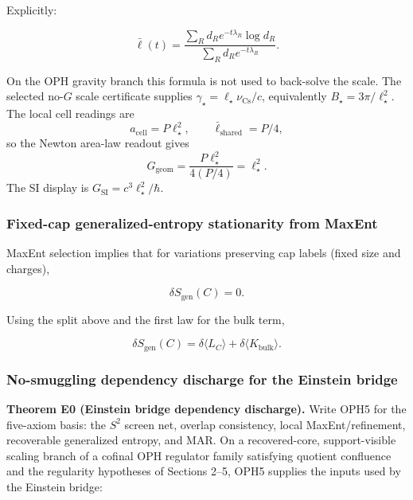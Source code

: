 Explicitly:

\[
\bar{\ell}(t) = \frac{\sum_R d_R e^{-t\lambda_R} \log d_R}{\sum_R d_R e^{-t\lambda_R}}.
\]

On the OPH gravity branch this formula is not used to back-solve the scale. The selected
no-\(G\) scale certificate supplies
\(\gamma_\star=\ell_\star\nu_{\mathrm{Cs}}/c\), equivalently
\(B_\star=3\pi/\ell_\star^2\). The local cell readings are
\[
a_{\mathrm{cell}}=P\ell_\star^2,
\qquad
\bar{\ell}_{\mathrm{shared}}=P/4,
\]
so the Newton area-law readout gives
\[
G_{\mathrm{geom}}
=
\frac{P\ell_\star^2}{4(P/4)}
=
\ell_\star^2.
\]
The SI display is \(G_{\mathrm{SI}}=c^3\ell_\star^2/\hbar\).

\subsubsection{Fixed-cap generalized-entropy stationarity from MaxEnt}\label{55-entanglement-equilibrium-from-maxent}

MaxEnt selection implies that for variations preserving cap labels (fixed size and charges),

\[
\delta S_{\mathrm{gen}}(C) = 0.
\]

Using the split above and the first law for the bulk term,

\[
\delta S_{\mathrm{gen}}(C) = \delta \langle L_C \rangle + \delta \langle K_{\mathrm{bulk}} \rangle.
\]

\subsubsection{No-smuggling dependency discharge for the Einstein bridge}\label{56a-no-smuggling-dependency-discharge-for-the-einstein-bridge}

\textbf{Theorem E0 (Einstein bridge dependency discharge).} Write OPH5 for the five-axiom basis: the \(S^2\) screen net, overlap consistency, local MaxEnt/refinement, recoverable generalized entropy, and MAR. On a recovered-core, support-visible scaling branch of a cofinal OPH regulator family satisfying quotient confluence and the regularity hypotheses of Sections 2--5, OPH5 supplies the inputs used by the Einstein bridge:


